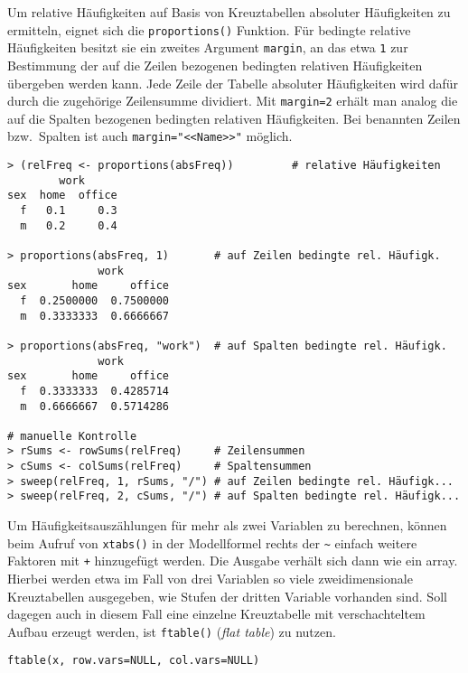 Um relative Häufigkeiten auf Basis von Kreuztabellen absoluter Häufigkeiten zu ermitteln, eignet sich die \lstinline!proportions()! Funktion. Für bedingte relative Häufigkeiten besitzt sie ein zweites Argument \lstinline!margin!, an das etwa \lstinline!1! zur Bestimmung der auf die Zeilen bezogenen bedingten relativen Häufigkeiten übergeben werden kann. Jede Zeile der Tabelle absoluter Häufigkeiten wird dafür durch die zugehörige Zeilensumme dividiert. Mit \lstinline!margin=2! erhält man analog die auf die Spalten bezogenen bedingten relativen Häufigkeiten. Bei benannten Zeilen bzw.\ Spalten ist auch \lstinline!margin="<<Name>>"! möglich.
\begin{lstlisting}
> (relFreq <- proportions(absFreq))         # relative Häufigkeiten
        work
sex  home  office
  f   0.1     0.3
  m   0.2     0.4

> proportions(absFreq, 1)       # auf Zeilen bedingte rel. Häufigk.
              work
sex       home     office
  f  0.2500000  0.7500000
  m  0.3333333  0.6666667

> proportions(absFreq, "work")  # auf Spalten bedingte rel. Häufigk.
              work
sex       home     office
  f  0.3333333  0.4285714
  m  0.6666667  0.5714286

# manuelle Kontrolle
> rSums <- rowSums(relFreq)     # Zeilensummen
> cSums <- colSums(relFreq)     # Spaltensummen
> sweep(relFreq, 1, rSums, "/") # auf Zeilen bedingte rel. Häufigk...
> sweep(relFreq, 2, cSums, "/") # auf Spalten bedingte rel. Häufigk...
\end{lstlisting}

Um Häufigkeitsauszählungen für mehr als zwei Variablen zu berechnen, können beim Aufruf von \lstinline!xtabs()! in der Modellformel rechts der \lstinline!~! einfach weitere Faktoren mit \lstinline!+! hinzugefügt werden. Die Ausgabe verhält sich dann wie ein array. Hierbei werden etwa im Fall von drei Variablen so viele zweidimensionale Kreuztabellen ausgegeben, wie Stufen der dritten Variable vorhanden sind. Soll dagegen auch in diesem Fall eine einzelne Kreuztabelle mit verschachteltem Aufbau erzeugt werden, ist \lstinline!ftable()! (\emph{flat table}) zu nutzen.
\begin{lstlisting}
ftable(x, row.vars=NULL, col.vars=NULL)
\end{lstlisting}

